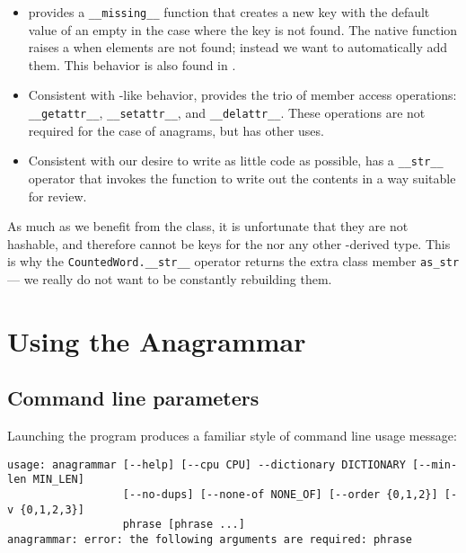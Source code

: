 \documentclass[letterpaper, 11pt]{article}
\begin{document}
\begin{itemize}
\item {} provides a \verb|__missing__| function that
creates a new key with the default value of an empty  in
the case where the key is not found. The native  function
raises a  when elements are not found; instead we want to
automatically add them. This behavior is also found in .

\item Consistent with -like behavior,  provides
the trio of member access operations: \verb|__getattr__|, \verb|__setattr__|,
and \verb|__delattr__|. These operations are not required for the 
case of anagrams, but  has other uses.

\item Consistent with our desire to write as little code as possible, 
 has a \verb|__str__| operator that invokes the 
function to write out the contents in a way suitable for review.

\end{itemize}

As much as we benefit from the  class, it is unfortunate
that they are not hashable, and therefore cannot be keys for the 
nor any other -derived type. This is why the \verb|CountedWord.__str__| 
operator returns the extra class member \verb|as_str| --- we really do not want
to be constantly rebuilding them. 

\section{Using the Anagrammar}
\subsection{Command line parameters}

Launching the program produces a familiar style of command line usage 
message:

\small
\begin{verbatim}
usage: anagrammar [--help] [--cpu CPU] --dictionary DICTIONARY [--min-len MIN_LEN]
                  [--no-dups] [--none-of NONE_OF] [--order {0,1,2}] [-v {0,1,2,3}]
                  phrase [phrase ...]
anagrammar: error: the following arguments are required: phrase
\end{verbatim}
\normalsize
\end{document}
